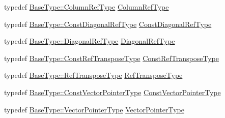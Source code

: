 \begin{DoxyCompactItemize}
\item 
typedef \hyperlink{classvct_dynamic_const_matrix_base_a232026578d12a51aa5228dee998b5663}{Base\+Type\+::\+Column\+Ref\+Type} \hyperlink{classvct_dynamic_matrix_base_a6fabbe3b8fdbfbb4a53f90622a520699}{Column\+Ref\+Type}
\item 
typedef \hyperlink{classvct_dynamic_const_matrix_base_aa497314340719c9e70a4991d3f306d7e}{Base\+Type\+::\+Const\+Diagonal\+Ref\+Type} \hyperlink{classvct_dynamic_matrix_base_ade45bdec8e92cad6e570939dc15d5450}{Const\+Diagonal\+Ref\+Type}
\item 
typedef \hyperlink{classvct_dynamic_const_matrix_base_a2773e894d2ce8aa7a479eeecc535ac33}{Base\+Type\+::\+Diagonal\+Ref\+Type} \hyperlink{classvct_dynamic_matrix_base_a594a79de6406a638f5e725daa76294a6}{Diagonal\+Ref\+Type}
\item 
typedef \hyperlink{classvct_dynamic_const_matrix_base_a2ee053ef5a591f470076e2a0c215fa44}{Base\+Type\+::\+Const\+Ref\+Transpose\+Type} \hyperlink{classvct_dynamic_matrix_base_a31dd42ab337cbc881f843c09aa141288}{Const\+Ref\+Transpose\+Type}
\item 
typedef \hyperlink{classvct_dynamic_const_matrix_base_afff0f3bee56a8562e0ec772b35e24475}{Base\+Type\+::\+Ref\+Transpose\+Type} \hyperlink{classvct_dynamic_matrix_base_a21a1c69f7e029b28a2884718ac9c297b}{Ref\+Transpose\+Type}
\item 
typedef \hyperlink{classvct_dynamic_const_matrix_base_ae4eb1369d9d05fdf98786c5583834e73}{Base\+Type\+::\+Const\+Vector\+Pointer\+Type} \hyperlink{classvct_dynamic_matrix_base_ac8edef5d93a5e13b019a0c12744ddd18}{Const\+Vector\+Pointer\+Type}
\item 
typedef \hyperlink{classvct_dynamic_const_matrix_base_aa3fdaf7217ea2667db03af719c3371c4}{Base\+Type\+::\+Vector\+Pointer\+Type} \hyperlink{classvct_dynamic_matrix_base_a58735349c10ccb0b0b1708b52e3a1569}{Vector\+Pointer\+Type}
\end{DoxyCompactItemize}
